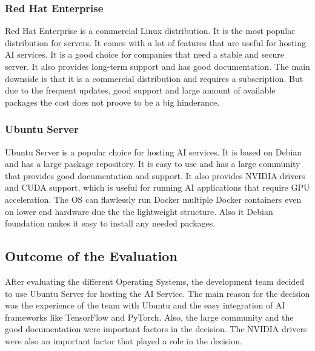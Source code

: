 \cite{LinuxForServerDebian}

\subsubsection{Red Hat Enterprise}

Red Hat Enterprise is a commercial Linux distribution. It is the most popular distribution for servers. It comes with a lot of features that are useful for hosting AI services. It is a good choice for companies that need a stable and secure server. It also provides long-term support and has good documentation.
The main downside is that it is a commercial distribution and requires a subscription. But due to the frequent updates, good support and large amount of available packages the cost does not proove to be a big hinderance.

\cite{LinuxForServerRedhat}

\subsubsection{Ubuntu Server}

Ubuntu Server is a popular choice for hosting AI services. It is based on Debian and has a large package repository. It is easy to use and has a large community that provides good documentation and support. It also provides NVIDIA drivers and CUDA support, which is useful for running AI applications that require GPU acceleration.
The OS can flawlessly run Docker multiple Docker containers even on lower end hardware due the the lightweight structure. Also it Debian foundation makes it easy to install any needed packages. 

\cite{LinuxForServerUbuntu} 

\subsection {Outcome of the Evaluation}

After evaluating the different Operating Systems, the development team decided to use Ubuntu Server for hosting the AI Service.
The main reason for the decision was the experience of the team with Ubuntu and the easy integration of AI frameworks like TensorFlow and PyTorch.
Also, the large community and the good documentation were important factors in the decision. The NVIDIA drivers were also an important factor that played a role in the decision.


\author{Florian Prandstetter}
